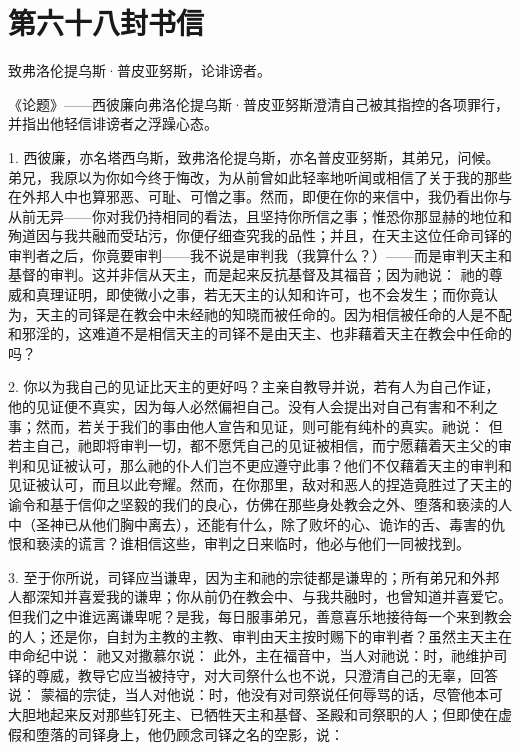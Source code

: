 \section{第六十八封书信}

致弗洛伦提乌斯·普皮亚努斯，论诽谤者。\par

《论题》——西彼廉向弗洛伦提乌斯·普皮亚努斯澄清自己被其指控的各项罪行，并指出他轻信诽谤者之浮躁心态。\par

1. 西彼廉，亦名塔西乌斯，致弗洛伦提乌斯，亦名普皮亚努斯，其弟兄，问候。弟兄，我原以为你如今终于悔改，为从前曾如此轻率地听闻或相信了关于我的那些在外邦人中也算邪恶、可耻、可憎之事。然而，即便在你的来信中，我仍看出你与从前无异——你对我仍持相同的看法，且坚持你所信之事；惟恐你那显赫的地位和殉道因与我共融而受玷污，你便仔细查究我的品性；并且，在天主这位任命司铎的审判者之后，你竟要审判——我不说是审判我（我算什么？）——而是审判天主和基督的审判。这并非信从天主，而是起来反抗基督及其福音；因为祂说： 祂的尊威和真理证明，即使微小之事，若无天主的认知和许可，也不会发生；而你竟认为，天主的司铎是在教会中未经祂的知晓而被任命的。因为相信被任命的人是不配和邪淫的，这难道不是相信天主的司铎不是由天主、也非藉着天主在教会中任命的吗？\par

2. 你以为我自己的见证比天主的更好吗？主亲自教导并说，若有人为自己作证，他的见证便不真实，因为每人必然偏袒自己。没有人会提出对自己有害和不利之事；然而，若关于我们的事由他人宣告和见证，则可能有纯朴的真实。祂说： 但若主自己，祂即将审判一切，都不愿凭自己的见证被相信，而宁愿藉着天主父的审判和见证被认可，那么祂的仆人们岂不更应遵守此事？他们不仅藉着天主的审判和见证被认可，而且以此夸耀。然而，在你那里，敌对和恶人的捏造竟胜过了天主的谕令和基于信仰之坚毅的我们的良心，仿佛在那些身处教会之外、堕落和亵渎的人中（圣神已从他们胸中离去），还能有什么，除了败坏的心、诡诈的舌、毒害的仇恨和亵渎的谎言？谁相信这些，审判之日来临时，他必与他们一同被找到。\par

3. 至于你所说，司铎应当谦卑，因为主和祂的宗徒都是谦卑的；所有弟兄和外邦人都深知并喜爱我的谦卑；你从前仍在教会中、与我共融时，也曾知道并喜爱它。但我们之中谁远离谦卑呢？是我，每日服事弟兄，善意喜乐地接待每一个来到教会的人；还是你，自封为主教的主教、审判由天主按时赐下的审判者？虽然主天主在申命纪中说： 祂又对撒慕尔说： 此外，主在福音中，当人对祂说：时，祂维护司铎的尊威，教导它应当被持守，对大司祭什么也不说，只澄清自己的无辜，回答说： 蒙福的宗徒，当人对他说：时，他没有对司祭说任何辱骂的话，尽管他本可大胆地起来反对那些钉死主、已牺牲天主和基督、圣殿和司祭职的人；但即使在虚假和堕落的司铎身上，他仍顾念司铎之名的空影，说：\par


